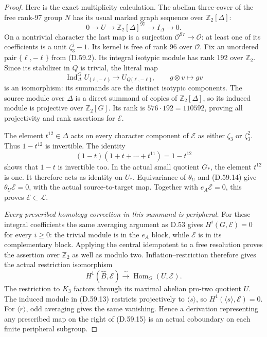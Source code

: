 \begin{proof}
Here is the exact multiplicity calculation.
The abelian three-cover of the free rank-97
group \(N\) has its usual marked graph sequence
over \(\mathbb Z_2[\Delta]\):
\[
 0\longrightarrow U\longrightarrow
       \mathbb Z_2[\Delta]^{97}
       \longrightarrow I_\Delta\longrightarrow0.
 \tag{D.59.12}
\]
On a nontrivial character the last map is a
surjection \(\mathcal O^{97}\to\mathcal O\):
at least one of its coefficients is a unit
\(\zeta_3^j-1\). Its kernel is free of rank
96 over \(\mathcal O\). Fix an unordered
pair \(\{\ell,-\ell\}\) from (D.59.2).
Its integral isotypic module has rank 192
over \(\mathbb Z_2\). Since its stabilizer
in \(Q\) is trivial, the literal map
\[
 \operatorname{Ind}_\Delta^G
          U_{\{\ell,-\ell\}}\longrightarrow
             U_{Q\{\ell,-\ell\}},
 \qquad g\otimes v\longmapsto gv
 \tag{D.59.13}
\]
is an isomorphism: its summands are the
distinct isotypic components. The source
module over \(\Delta\) is a direct summand
of copies of \(\mathbb Z_2[\Delta]\), so
its induced module is projective over
\(\mathbb Z_2[G]\). Its rank is
\(576\cdot192=110592\), proving all
projectivity and rank assertions for
\(\mathscr E\).

The element \(t^{12}\in\Delta\) acts on
every character component of \(\mathscr E\)
as either \(\zeta_3\) or \(\zeta_3^2\).
Thus \(1-t^{12}\) is invertible. The
identity
\[
 (1-t)(1+t+\cdots+t^{11})=1-t^{12}
 \tag{D.59.14}
\]
shows that \(1-t\) is invertible too.
In the actual small quotient \(G_*\), the
element \(t^{12}\) is one. It therefore
acts as identity on \(U_*\). Equivariance
of \(\theta_U\) and (D.59.14) give
\(\theta_U\mathscr E=0\), with the
actual source-to-target map. Together with
\(e_A\mathscr E=0\), this proves
\(\mathscr E\subset\mathcal L\).

\emph{Every prescribed homology correction in this summand is peripheral.}
For these integral coefficients the same
averaging argument as D.53 gives
\(H^i(G,\mathscr E)=0\) for every \(i\geq0\):
the trivial module is in the \(e_A\) block,
while \(\mathscr E\) is in its complementary
block. Applying the central idempotent to a
free resolution proves the assertion over
\(\mathbb Z_2\) as well as modulo two.
Inflation--restriction therefore gives the
actual restriction isomorphism
\[
 H^1(\widehat B,\mathscr E)
       \xrightarrow{\ \sim\ }
          \operatorname{Hom}_G(U,\mathscr E).
 \tag{D.59.15}
\]
The restriction to \(K_3\) factors through
its maximal abelian pro-two quotient \(U\).
The induced module in (D.59.13) restricts
projectively to \(\langle s\rangle\), so
\(H^1(\langle s\rangle,\mathscr E)=0\).
For \(\langle r\rangle\), odd averaging
gives the same vanishing. Hence a derivation
representing any prescribed map on the
right of (D.59.15) is an actual coboundary
on each finite peripheral subgroup.


\end{proof}
